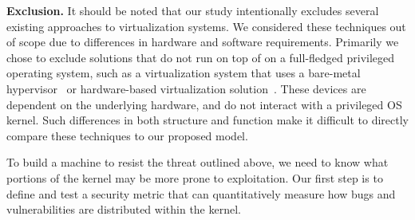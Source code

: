 \noindent
\textbf{Exclusion.}
It should be noted that our study intentionally excludes several existing
approaches to virtualization systems. We considered these techniques
out of scope due to differences in hardware and software requirements.
Primarily we chose to exclude solutions that do not run on top of on a full-fledged
privileged operating system, such as a virtualization system that uses a
bare-metal hypervisor~\cite{Xen-03} or hardware-based virtualization
solution~\cite{IntelVT}.
These devices are dependent on the underlying hardware, and do not interact
with a privileged OS kernel. Such differences in both structure and function
make it difficult to directly compare these techniques to our proposed model.

To build a machine to resist the threat outlined above, we need to know what
portions of the kernel may be more prone to exploitation. Our first step is to
define and test a security metric that can quantitatively measure how bugs and
 vulnerabilities
are distributed within the kernel.
